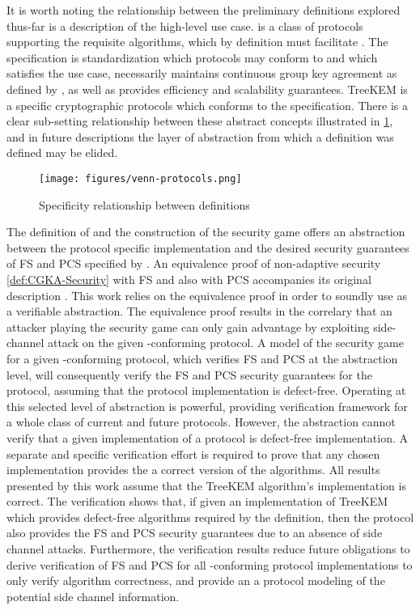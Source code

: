 It is worth noting the relationship between the preliminary definitions explored thus-far
 is a description of the high-level use case.
 is a class of protocols supporting the requisite algorithms, which by definition must facilitate .
The  specification is standardization which protocols may conform to and which satisfies the  use case, necessarily maintains continuous group key agreement as defined by , as well as provides efficiency and scalability guarantees.
TreeKEM is a specific cryptographic protocols which conforms to the  specification.
There is a clear sub-setting relationship between these abstract concepts illustrated in \ref{fig:venn-protocols}, and in future descriptions the layer of abstraction from which a definition was defined may be elided.

\begin{figure}
\centering
\texttt{[image: figures/venn-protocols.png]}
\caption{Specificity relationship between definitions \label{fig:venn-protocols}}
\end{figure}

The definition of  and the construction of the  security game offers an abstraction between the protocol specific implementation and the desired security guarantees of FS and PCS specified by .
An equivalence proof of non-adaptive  security \ref{def:CGKA-Security} with FS and also with PCS accompanies its original description \autocite{alwen2020security}.
This work relies on the equivalence proof in order to soundly use  as a verifiable abstraction.
The equivalence proof results in the correlary that an attacker playing the  security game can only gain advantage by exploiting side-channel attack on the given -conforming protocol.
A model of the  security game for a given -conforming protocol, which verifies FS and PCS at the abstraction level, will consequently verify the FS and PCS security guarantees for the protocol, assuming that the protocol implementation is defect-free.
Operating at this selected level of abstraction is powerful, providing verification framework for a whole class of current and future protocols.
However, the  abstraction cannot verify that a given implementation of a protocol is defect-free implementation.
A separate and specific verification effort is required to prove that any chosen implementation provides the a correct version of the  algorithms.
All results presented by this work assume that the TreeKEM algorithm's implementation is correct.
The verification shows that, if given an implementation of TreeKEM which provides defect-free algorithms required by the  definition, then the protocol also provides the FS and PCS security guarantees due to an absence of side channel attacks.
Furthermore, the verification results reduce future obligations to derive verification of FS and PCS for all -conforming protocol implementations to only verify algorithm correctness, and provide an a protocol modeling of the potential side channel information.
